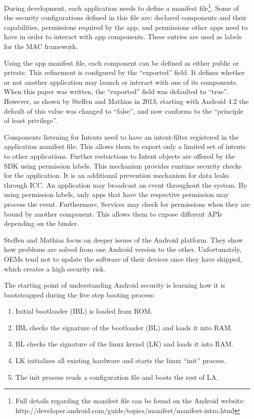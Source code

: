 During development, each application needs to define a manifest file\footnote{Full details regarding the manifest file can be found on the Android website: http://developer.android.com/guide/topics/manifest/manifest-intro.html}. Some of the security configurations defined in this file are: declared components and their capabilities, permissions required by the app, and permissions other apps need to have in order to interact with app components. These entries are used as labels for the MAC framework. 

Using the app manifest file, each component can be defined as either public or private. This refinement is configured by the ``exported'' field. It defines whether or not another application may launch or interact with one of its components. When this paper was written, the ``exported'' field was defaulted to ``true''. However, as shown by Steffen and Mathias \cite{liebergeld2013android}  in 2013, starting with Android 4.2  the default of this value was changed to ``false'', and now conforms to the ``principle of least privilege''.

Components listening for Intents need to have an intent-filter registered in the application manifest file. This allows them to export only a limited set of intents to other applications. Further restrictions to Intent objects are offered by the SDK using permission labels. This mechanism provides runtime security checks for the application. It is an additional prevention mechanism for data leaks through ICC. An application may broadcast an event throughout the system. By using permission labels, only apps that have the respective permission may process the event. Furthermore, Services may check for permissions when they are bound by another component. This allows them to expose different APIs depending on the binder.

Steffen and Mathias \cite{liebergeld2013android} focus on deeper issues of the Android platform. They show how problems are solved from one Android version to the other. Unfortunately, OEMs tend not to update the software of their devices once they have shipped, which creates a high security risk.

The starting point of understanding Android security is learning how it is bootstrapped during the five step booting process:
\begin{enumerate}
	\item Initial bootloader (IBL) is loaded from ROM.
	\item IBL checks the signature of the bootloader (BL) and loads it into RAM.
	\item BL checks the signature of the linux kernel (LK) and loads it into RAM.
	\item LK initialises all existing hardware and starts the linux ``init'' process.
	\item The init process reads a configuration file and boots the rest of LA.
\end{enumerate}


